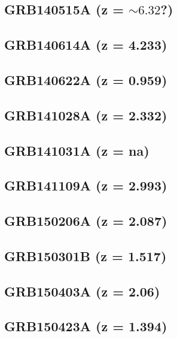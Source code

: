 \documentclass{aa}    %
\begin{document}
\subsection{GRB140515A (z = $\sim6.32$?)}	



\subsection{GRB140614A (z = 4.233)}	



\subsection{GRB140622A (z = 0.959)}	



\subsection{GRB141028A (z = 2.332)}	



\subsection{GRB141031A  (z = na)}	



\subsection{GRB141109A (z = 2.993)}	



\subsection{GRB150206A (z = 2.087)}	



\subsection{GRB150301B (z = 1.517)}	



\subsection{GRB150403A (z = 2.06)}	



\subsection{GRB150423A (z = 1.394)}	
\end{document}
